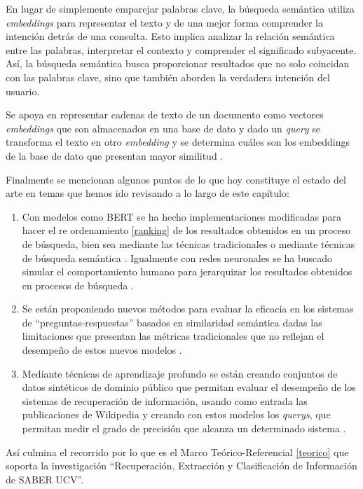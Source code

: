 \documentclass[
  12pt,
  openany]{book}
\begin{document}
En lugar de simplemente emparejar palabras clave, la búsqueda semántica utiliza \emph{embeddings} para representar el texto y de una mejor forma comprender la intención detrás de una consulta. Esto implica analizar la relación semántica entre las palabras, interpretar el contexto y comprender el significado subyacente. Así, la búsqueda semántica busca proporcionar resultados que no solo coincidan con las palabras clave, sino que también aborden la verdadera intención del usuario.

Se apoya en representar cadenas de texto de un documento como vectores \emph{embeddings} que son almacenados en una base de dato y dado un \emph{query} se transforma el texto en otro \emph{embedding} y se determina cuáles son los embeddings de la base de dato que presentan mayor similitud \citep{muennighoff2022a}.

Finalmente se mencionan algunos puntos de lo que hoy constituye el estado del arte en temas que hemos ido revisando a lo largo de este capítulo:

\begin{enumerate}
\def\labelenumi{\arabic{enumi}.}
\item
  Con modelos como BERT se ha hecho implementaciones modificadas para hacer el re ordenamiento \ref{ranking} de los resultados obtenidos en un proceso de búsqueda, bien sea mediante las técnicas tradicionales o mediante técnicas de búsqueda semántica\citep{nogueira2019} . Igualmente con redes neuronales se ha buscado simular el comportamiento humano para jerarquizar los resultados obtenidos en procesos de búsqueda \citep{pang2017}.
\item
  Se están proponiendo nuevos métodos para evaluar la eficacia en los sistemas de ``preguntas-respuestas'' basados en similaridad semántica dadas las limitaciones que presentan las métricas tradicionales que no reflejan el desempeño de estos nuevos modelos \citep{risch2021}.
\item
  Mediante técnicas de aprendizaje profundo se están creando conjuntos de datos sintéticos de dominio público que permitan evaluar el desempeño de los sistemas de recuperación de información, usando como entrada las publicaciones de Wikipedia y creando con estos modelos los \emph{querys}, que permitan medir el grado de precisión que alcanza un determinado sistema \citep{frej-etal-2020-wikir}.
\end{enumerate}

Así culmina el recorrido por lo que es el Marco Teórico-Referencial \ref{teorico} que soporta la investigación ``Recuperación, Extracción y Clasificación de Información de SABER UCV''.
\end{document}
